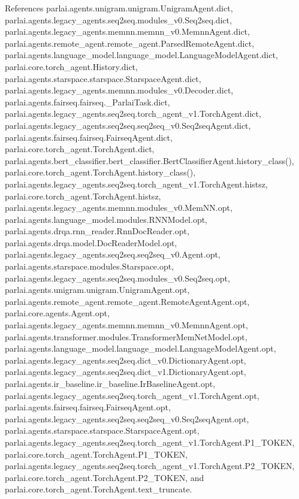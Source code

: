 References parlai.\+agents.\+unigram.\+unigram.\+Unigram\+Agent.\+dict, parlai.\+agents.\+legacy\+\_\+agents.\+seq2seq.\+modules\+\_\+v0.\+Seq2seq.\+dict, parlai.\+agents.\+legacy\+\_\+agents.\+memnn.\+memnn\+\_\+v0.\+Memnn\+Agent.\+dict, parlai.\+agents.\+remote\+\_\+agent.\+remote\+\_\+agent.\+Parsed\+Remote\+Agent.\+dict, parlai.\+agents.\+language\+\_\+model.\+language\+\_\+model.\+Language\+Model\+Agent.\+dict, parlai.\+core.\+torch\+\_\+agent.\+History.\+dict, parlai.\+agents.\+starspace.\+starspace.\+Starspace\+Agent.\+dict, parlai.\+agents.\+legacy\+\_\+agents.\+memnn.\+modules\+\_\+v0.\+Decoder.\+dict, parlai.\+agents.\+fairseq.\+fairseq.\+\_\+\+Parlai\+Task.\+dict, parlai.\+agents.\+legacy\+\_\+agents.\+seq2seq.\+torch\+\_\+agent\+\_\+v1.\+Torch\+Agent.\+dict, parlai.\+agents.\+legacy\+\_\+agents.\+seq2seq.\+seq2seq\+\_\+v0.\+Seq2seq\+Agent.\+dict, parlai.\+agents.\+fairseq.\+fairseq.\+Fairseq\+Agent.\+dict, parlai.\+core.\+torch\+\_\+agent.\+Torch\+Agent.\+dict, parlai.\+agents.\+bert\+\_\+classifier.\+bert\+\_\+classifier.\+Bert\+Classifier\+Agent.\+history\+\_\+class(), parlai.\+core.\+torch\+\_\+agent.\+Torch\+Agent.\+history\+\_\+class(), parlai.\+agents.\+legacy\+\_\+agents.\+seq2seq.\+torch\+\_\+agent\+\_\+v1.\+Torch\+Agent.\+histsz, parlai.\+core.\+torch\+\_\+agent.\+Torch\+Agent.\+histsz, parlai.\+agents.\+legacy\+\_\+agents.\+memnn.\+modules\+\_\+v0.\+Mem\+N\+N.\+opt, parlai.\+agents.\+language\+\_\+model.\+modules.\+R\+N\+N\+Model.\+opt, parlai.\+agents.\+drqa.\+rnn\+\_\+reader.\+Rnn\+Doc\+Reader.\+opt, parlai.\+agents.\+drqa.\+model.\+Doc\+Reader\+Model.\+opt, parlai.\+agents.\+legacy\+\_\+agents.\+seq2seq.\+seq2seq\+\_\+v0.\+Agent.\+opt, parlai.\+agents.\+starspace.\+modules.\+Starspace.\+opt, parlai.\+agents.\+legacy\+\_\+agents.\+seq2seq.\+modules\+\_\+v0.\+Seq2seq.\+opt, parlai.\+agents.\+unigram.\+unigram.\+Unigram\+Agent.\+opt, parlai.\+agents.\+remote\+\_\+agent.\+remote\+\_\+agent.\+Remote\+Agent\+Agent.\+opt, parlai.\+core.\+agents.\+Agent.\+opt, parlai.\+agents.\+legacy\+\_\+agents.\+memnn.\+memnn\+\_\+v0.\+Memnn\+Agent.\+opt, parlai.\+agents.\+transformer.\+modules.\+Transformer\+Mem\+Net\+Model.\+opt, parlai.\+agents.\+language\+\_\+model.\+language\+\_\+model.\+Language\+Model\+Agent.\+opt, parlai.\+agents.\+legacy\+\_\+agents.\+seq2seq.\+dict\+\_\+v0.\+Dictionary\+Agent.\+opt, parlai.\+agents.\+legacy\+\_\+agents.\+seq2seq.\+dict\+\_\+v1.\+Dictionary\+Agent.\+opt, parlai.\+agents.\+ir\+\_\+baseline.\+ir\+\_\+baseline.\+Ir\+Baseline\+Agent.\+opt, parlai.\+agents.\+legacy\+\_\+agents.\+seq2seq.\+torch\+\_\+agent\+\_\+v1.\+Torch\+Agent.\+opt, parlai.\+agents.\+fairseq.\+fairseq.\+Fairseq\+Agent.\+opt, parlai.\+agents.\+legacy\+\_\+agents.\+seq2seq.\+seq2seq\+\_\+v0.\+Seq2seq\+Agent.\+opt, parlai.\+agents.\+starspace.\+starspace.\+Starspace\+Agent.\+opt, parlai.\+agents.\+legacy\+\_\+agents.\+seq2seq.\+torch\+\_\+agent\+\_\+v1.\+Torch\+Agent.\+P1\+\_\+\+T\+O\+K\+EN, parlai.\+core.\+torch\+\_\+agent.\+Torch\+Agent.\+P1\+\_\+\+T\+O\+K\+EN, parlai.\+agents.\+legacy\+\_\+agents.\+seq2seq.\+torch\+\_\+agent\+\_\+v1.\+Torch\+Agent.\+P2\+\_\+\+T\+O\+K\+EN, parlai.\+core.\+torch\+\_\+agent.\+Torch\+Agent.\+P2\+\_\+\+T\+O\+K\+EN, and parlai.\+core.\+torch\+\_\+agent.\+Torch\+Agent.\+text\+\_\+truncate.


